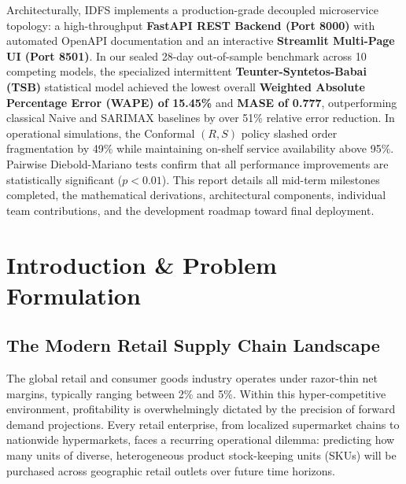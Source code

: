 \documentclass[12pt,a4paper,oneside]{report}
\theoremstyle{definition}
\begin{document}
\noindent Architecturally, IDFS implements a production-grade decoupled microservice topology: a high-throughput \textbf{FastAPI REST Backend (Port 8000)} with automated OpenAPI documentation and an interactive \textbf{Streamlit Multi-Page UI (Port 8501)}. In our sealed 28-day out-of-sample benchmark across 10 competing models, the specialized intermittent \textbf{Teunter-Syntetos-Babai (TSB)} statistical model achieved the lowest overall \textbf{Weighted Absolute Percentage Error (WAPE) of 15.45\%} and \textbf{MASE of 0.777}, outperforming classical Naive and SARIMAX baselines by over 51\% relative error reduction. In operational simulations, the Conformal $(R, S)$ policy slashed order fragmentation by 49\% while maintaining on-shelf service availability above 95\%. Pairwise Diebold-Mariano tests confirm that all performance improvements are statistically significant ($p < 0.01$). This report details all mid-term milestones completed, the mathematical derivations, architectural components, individual team contributions, and the development roadmap toward final deployment.

\newpage
\tableofcontents

\newpage
\listoftables

\newpage
\listoffigures

\newpage
\chapter{Introduction \& Problem Formulation}

\section{The Modern Retail Supply Chain Landscape}
The global retail and consumer goods industry operates under razor-thin net margins, typically ranging between 2\% and 5\%. Within this hyper-competitive environment, profitability is overwhelmingly dictated by the precision of forward demand projections. Every retail enterprise, from localized supermarket chains to nationwide hypermarkets, faces a recurring operational dilemma: predicting how many units of diverse, heterogeneous product stock-keeping units (SKUs) will be purchased across geographic retail outlets over future time horizons.
\end{document}
